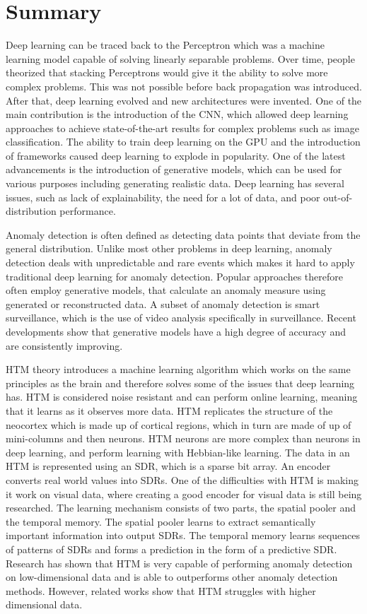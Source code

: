 \section{Summary}
Deep learning can be traced back to the Perceptron which was a machine learning model capable of solving linearly separable problems. Over time, people theorized that stacking Perceptrons would give it the ability to solve more complex problems. This was not possible before back propagation was introduced. After that, deep learning evolved and new architectures were invented. One of the main contribution is the introduction of the CNN, which allowed deep learning approaches to achieve state-of-the-art results for complex problems such as image classification. The ability to train deep learning on the GPU and the introduction of frameworks caused deep learning to explode in popularity. One of the latest advancements is the introduction of generative models, which can be used for various purposes including generating realistic data. Deep learning has several issues, such as lack of explainability, the need for a lot of data, and poor out-of-distribution performance.
\par
Anomaly detection is often defined as detecting data points that deviate from the general distribution. Unlike most other problems in deep learning, anomaly detection deals with unpredictable and rare events which makes it hard to apply traditional deep learning for anomaly detection. Popular approaches therefore often employ generative models, that calculate an anomaly measure using generated or reconstructed data. A subset of anomaly detection is smart surveillance, which is the use of video analysis specifically in surveillance. Recent developments show that generative models have a high degree of accuracy and are consistently improving.
\par
HTM theory introduces a machine learning algorithm which works on the same principles as the brain and therefore solves some of the issues that deep learning has. HTM is considered noise resistant and can perform online learning, meaning that it learns as it observes more data. HTM replicates the structure of the neocortex which is made up of cortical regions, which in turn are made of up of mini-columns and then neurons. HTM neurons are more complex than neurons in deep learning, and perform learning with Hebbian-like learning. The data in an HTM is represented using an SDR, which is a sparse bit array. An encoder converts real world values into SDRs. One of the difficulties with HTM is making it work on visual data, where creating a good encoder for visual data is still being researched. The learning mechanism consists of two parts, the spatial pooler and the temporal memory. The spatial pooler learns to extract semantically important information into output SDRs. The temporal memory learns sequences of patterns of SDRs and forms a prediction in the form of a predictive SDR. Research has shown that HTM is very capable of performing anomaly detection on low-dimensional data and is able to outperforms other anomaly detection methods. However, related works show that HTM struggles with higher dimensional data.